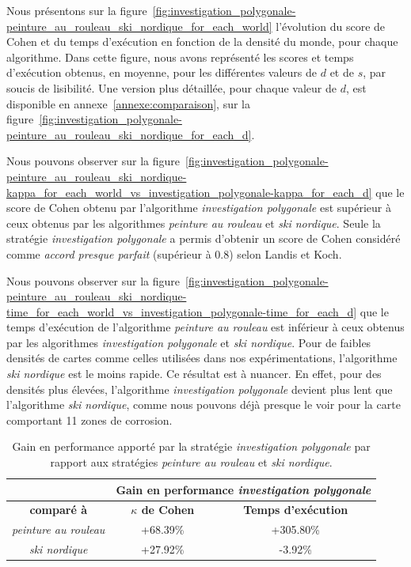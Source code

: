 \documentclass[english,RandD]{rapportPFE}  %
\begin{document}
			Nous présentons sur la figure~\ref{fig:investigation_polygonale-peinture_au_rouleau_ski_nordique_for_each_world} l'évolution du score de Cohen et du temps d'exécution en fonction de la densité du monde, pour chaque algorithme.
			Dans cette figure, nous avons représenté les scores et temps d'exécution obtenus, en moyenne, pour les différentes valeurs de $d$ et de $s$, par soucis de lisibilité.
			Une version plus détaillée, pour chaque valeur de $d$, est disponible en annexe~\ref{annexe:comparaison}, sur la figure~\ref{fig:investigation_polygonale-peinture_au_rouleau_ski_nordique_for_each_d}.

			Nous pouvons observer sur la figure~\ref{fig:investigation_polygonale-peinture_au_rouleau_ski_nordique-kappa_for_each_world_vs_investigation_polygonale-kappa_for_each_d} que le score de Cohen obtenu par l'algorithme \textit{investigation polygonale} est supérieur à ceux obtenus par les algorithmes \textit{peinture au rouleau} et \textit{ski nordique}.
			Seule la stratégie \textit{investigation polygonale} a permis d'obtenir un score de Cohen considéré comme \textit{accord presque parfait} (supérieur à 0.8) selon Landis et Koch.

			Nous pouvons observer sur la figure~\ref{fig:investigation_polygonale-peinture_au_rouleau_ski_nordique-time_for_each_world_vs_investigation_polygonale-time_for_each_d} que le temps d'exécution de l'algorithme \textit{peinture au rouleau} est inférieur à ceux obtenus par les algorithmes \textit{investigation polygonale} et \textit{ski nordique}.
			Pour de faibles densités de cartes comme celles utilisées dans nos expérimentations, l'algorithme \textit{ski nordique} est le moins rapide.
			Ce résultat est à nuancer.
			En effet, pour des densités plus élevées, l'algorithme \textit{investigation polygonale} devient plus lent que l'algorithme \textit{ski nordique}, comme nous pouvons déjà presque le voir pour la carte comportant 11 zones de corrosion.

			\begin{table}[h!]
				\centering
				\begin{tabular}{|c|c|c|}
					\hline
					& \multicolumn{2}{c|}{\textbf{Gain en performance \textit{investigation polygonale}}} \\
					\hline
					\textbf{comparé à} & \textbf{$\kappa$ de Cohen} & \textbf{Temps d'exécution} \\
					\hline
					\textit{peinture au rouleau} & +68.39\% & +305.80\% \\
					\hline
					\textit{ski nordique} & +27.92\% & -3.92\% \\
					\hline
				\end{tabular}
				\caption{Gain en performance apporté par la stratégie \textit{investigation polygonale} par rapport aux stratégies \textit{peinture au rouleau} et \textit{ski nordique}.}
				\label{tab:gain}
			\end{table}
\end{document}
